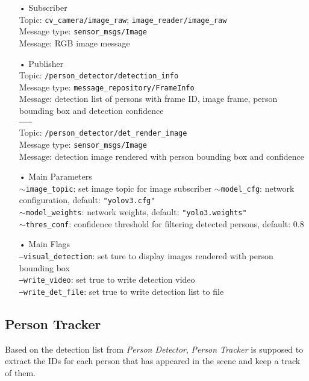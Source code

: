 \begin{itemize}
\item[•] Subscriber \\
Topic: \texttt{cv\_camera/image\_raw}; \texttt{image\_reader/image\_raw} \\
Message type: \texttt{sensor\_msgs/Image} \\
Message: RGB image message

\item[•] Publisher \\
Topic: \texttt{/person\_detector/detection\_info} \\
Message type: \texttt{message\_repository/FrameInfo} \\
Message: detection list of persons with frame ID, image frame, person bounding box and detection confidence \\
\texttt{--------} \\
Topic: \texttt{/person\_detector/det\_render\_image} \\
Message type: \texttt{sensor\_msgs/Image} \\
Message: detection image rendered with person bounding box and confidence 

\item[•] Main Parameters \\
\texttt{$\sim$image\_topic}: set image topic for image subscriber
\texttt{$\sim$model\_cfg}: network configuration, default: \texttt{"yolov3.cfg"} \\ 
\texttt{$\sim$model\_weights}: network weights, default: \texttt{"yolo3.weights"} \\
\texttt{$\sim$thres\_conf}: confidence threshold for filtering detected persons, default: 0.8

\item[•] Main Flags \\
\texttt{---visual\_detection}: set ture to display images rendered with person bounding box \\
\texttt{---write\_video}: set true to write detection video \\
\texttt{---write\_det\_file}: set true to write detection list to file \\
\end{itemize}

\subsection{Person Tracker}
\label{pipeline:PT}
Based on the detection list from \textit{Person Detector}, \textit{Person Tracker} is supposed to extract the IDs for each person that has appeared in the scene and keep a track of them. 

